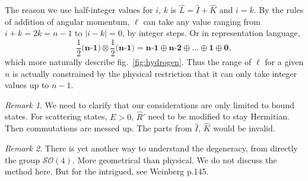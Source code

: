 \documentclass[a4paper,11pt]{article}
\theoremstyle{remark}
\newtheorem{remark}{Remark}[section]
\theoremstyle{defn}
\begin{document}
The reason we use half-integer values for $i,\,k$ is $\hat{L}=\hat{I}+\hat{K}$ and $i=k$. By the rules of addition 
of angular momentum, $\ell$ can take any value ranging from $i+k=2k=n-1$ to $|i-k|=0$, by integer steps. Or in 
representation language,
\begin{equation}
\textbf{$\frac{1}{2}$(n-1)}\otimes\textbf{$\frac{1}{2}$(n-1)} = 
\textbf{n-1}\oplus\textbf{n-2}\oplus\ldots\oplus\textbf{1}\oplus\textbf{0},
\end{equation}
which more naturally describe fig.~\ref{fig:hydrogen}. Thus the range of $\ell$ for a given $n$ is actually 
constrained by the physical restriction that it can only take integer values up to $n-1$.
\begin{remark}
We need to clarify that our considerations are only limited to bound states. For scattering states, $E>0$, $\hat{R}'$ need to be modified
to stay Hermitian. Then commutations are messed up. The parts from $\hat{I},\,\hat{K}$ would be invalid.
\end{remark}
\begin{remark}
There is yet another way to understand the degeneracy, from directly the group $\mathcal{SO}(4)$. More geometrical than physical. 
We do not discuss the method here. But for the intrigued, see Weinberg p.145.
\end{remark}
\end{document}
